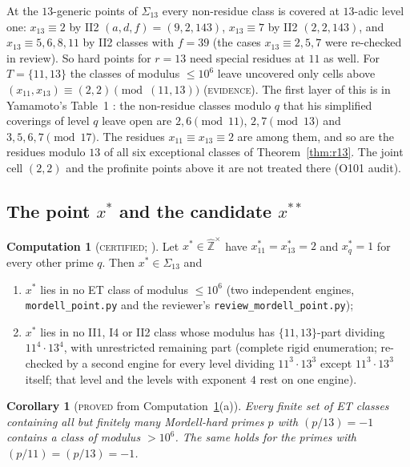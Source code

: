 \documentclass[11pt,reqno]{amsart}
\newtheorem{corollary}[theorem]{Corollary}
\theoremstyle{definition}
\newtheorem{computation}[theorem]{Computation}
\newcommand{\Z}{\mathbb Z}
\newcommand{\Zhu}{\widehat{\Z}^{\times}}
\newcommand{\status}[1]{\textup{\textsc{#1}}}
\begin{document}
At the $13$-generic points of $\Sigma_{13}$ every non-residue class is
covered at $13$-adic level one: $x_{13}\equiv2$ by II2 $(a,d,f)=(9,2,143)$,
$x_{13}\equiv7$ by II2 $(2,2,143)$, and $x_{13}\equiv5,6,8,11$ by II2
classes with $f=39$ \cite[\S1]{PM} (the cases $x_{13}\equiv2,5,7$ were
re-checked in review).  So hard
points for $r=13$ need special residues at $11$ as well.  For
$T=\{11,13\}$ the classes of modulus $\le10^6$ leave uncovered only cells
above $(x_{11},x_{13})\equiv(2,2)\pmod{(11,13)}$ (\status{evidence}).
The first layer of this is in Yamamoto's Table~1 \cite[p.~44]{Yamamoto}:
the non-residue classes modulo $q$ that his simplified coverings of
level $q$ leave open are $2,6\pmod{11}$, $2,7\pmod{13}$ and
$3,5,6,7\pmod{17}$.  The residues $x_{11}\equiv x_{13}\equiv2$ are among
them, and so are the residues modulo $13$ of all six exceptional classes
of Theorem~\ref{thm:r13}.  The joint cell $(2,2)$ and the profinite
points above it are not treated there (O101 audit).

\subsection{The point $x^*$ and the candidate $x^{**}$}

\begin{computation}[\status{certified}; {\cite[Comp.~4.1, \S4.1]{PM}}]\label{comp:xstar}
Let $x^*\in\Zhu$ have $x^*_{11}=x^*_{13}=2$ and $x^*_q=1$ for every other
prime $q$.  Then $x^*\in\Sigma_{13}$ and
\begin{enumerate}
\item[(a)] $x^*$ lies in no ET class of modulus $\le10^6$ (two
independent engines, \texttt{mordell\_point.py} and the reviewer's
\texttt{review\_mordell\_point.py});
\item[(b)] $x^*$ lies in no II1, I4 or II2 class whose modulus has
$\{11,13\}$-part dividing $11^4\cdot13^4$, with unrestricted remaining
part (complete rigid enumeration; re-checked by a second engine for every
level dividing $11^3\cdot13^3$ except $11^3\cdot13^3$ itself; that level
and the levels with exponent $4$ rest on one engine).
\end{enumerate}
\end{computation}

\begin{corollary}[\status{proved} from Computation~\ref{comp:xstar}(a)]
Every finite set of ET classes containing all but finitely many
Mordell-hard primes $p$ with $(p/13)=-1$ contains a class of modulus
$>10^6$.  The same holds for the primes with
$(p/11)=(p/13)=-1$.
\end{corollary}
\end{document}
